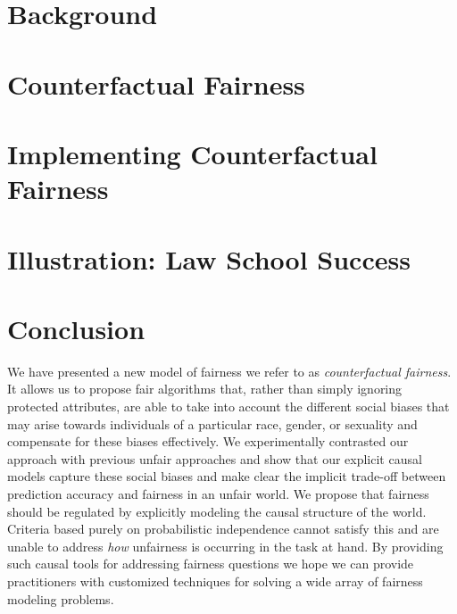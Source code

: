 \documentclass{article}
\begin{document}
\section{Background}
\label{sec:background}


%

%

\section{Counterfactual Fairness}
\label{sec:count_fair}


\section{Implementing Counterfactual Fairness}
\label{sec:methods}


\section{Illustration: Law School Success}
\label{sec:experiments}


\section{Conclusion}
\label{sec:conclusion}
We have presented a new model of fairness we refer to as {\em
  counterfactual fairness}. It allows us to propose fair algorithms
that, rather than simply ignoring protected attributes, are able to
take into account the different social biases that may arise towards
individuals of a particular race, gender, or sexuality and compensate
for these biases effectively. We experimentally contrasted our
approach with previous unfair approaches and show that our explicit
causal models capture these social biases and make clear the implicit
trade-off between prediction accuracy and fairness in an unfair
world. We propose that fairness should be regulated by explicitly
modeling the causal structure of the world. Criteria based purely on
probabilistic independence cannot satisfy this and are unable to
address \emph{how} unfairness is occurring in the task at hand. By
providing such causal tools for addressing fairness questions we hope
we can provide practitioners with customized techniques for solving a
wide array of fairness modeling problems.





\end{document}

